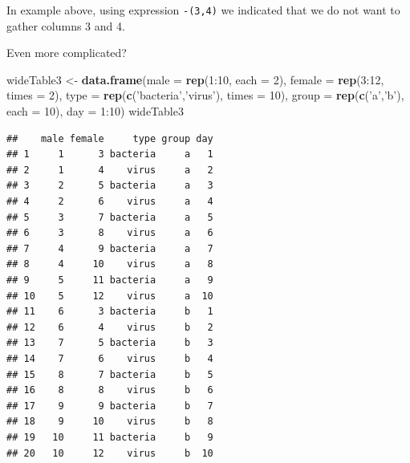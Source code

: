 \documentclass[]{book}
\newenvironment{Shaded}{\begin{snugshade}}{\end{snugshade}}
\newcommand{\KeywordTok}[1]{\textcolor[rgb]{0.12,0.11,0.11}{\textbf{#1}}}
\newcommand{\DataTypeTok}[1]{\textcolor[rgb]{0.00,0.34,0.68}{#1}}
\newcommand{\DecValTok}[1]{\textcolor[rgb]{0.69,0.50,0.00}{#1}}
\newcommand{\StringTok}[1]{\textcolor[rgb]{0.75,0.01,0.01}{#1}}
\newcommand{\OperatorTok}[1]{\textcolor[rgb]{0.12,0.11,0.11}{#1}}
\newcommand{\NormalTok}[1]{\textcolor[rgb]{0.12,0.11,0.11}{#1}}
\theoremstyle{definition}
\theoremstyle{definition}
\theoremstyle{definition}
\theoremstyle{remark}
\begin{document}
In example above, using expression \texttt{-(3,4)} we indicated that we
do not want to gather columns 3 and 4.

Even more complicated?

\begin{Shaded}
\begin{Highlighting}[]
\NormalTok{wideTable3 <-}\StringTok{ }\KeywordTok{data.frame}\NormalTok{(}\DataTypeTok{male =} \KeywordTok{rep}\NormalTok{(}\DecValTok{1}\OperatorTok{:}\DecValTok{10}\NormalTok{, }\DataTypeTok{each =} \DecValTok{2}\NormalTok{),}
                         \DataTypeTok{female =} \KeywordTok{rep}\NormalTok{(}\DecValTok{3}\OperatorTok{:}\DecValTok{12}\NormalTok{, }\DataTypeTok{times =} \DecValTok{2}\NormalTok{), }
                         \DataTypeTok{type =} \KeywordTok{rep}\NormalTok{(}\KeywordTok{c}\NormalTok{(}\StringTok{'bacteria'}\NormalTok{,}\StringTok{'virus'}\NormalTok{), }\DataTypeTok{times =} \DecValTok{10}\NormalTok{),}
                         \DataTypeTok{group =} \KeywordTok{rep}\NormalTok{(}\KeywordTok{c}\NormalTok{(}\StringTok{'a'}\NormalTok{,}\StringTok{'b'}\NormalTok{), }\DataTypeTok{each =} \DecValTok{10}\NormalTok{),}
                         \DataTypeTok{day =} \DecValTok{1}\OperatorTok{:}\DecValTok{10}\NormalTok{)}
\NormalTok{wideTable3}
\end{Highlighting}
\end{Shaded}

\begin{verbatim}
##    male female     type group day
## 1     1      3 bacteria     a   1
## 2     1      4    virus     a   2
## 3     2      5 bacteria     a   3
## 4     2      6    virus     a   4
## 5     3      7 bacteria     a   5
## 6     3      8    virus     a   6
## 7     4      9 bacteria     a   7
## 8     4     10    virus     a   8
## 9     5     11 bacteria     a   9
## 10    5     12    virus     a  10
## 11    6      3 bacteria     b   1
## 12    6      4    virus     b   2
## 13    7      5 bacteria     b   3
## 14    7      6    virus     b   4
## 15    8      7 bacteria     b   5
## 16    8      8    virus     b   6
## 17    9      9 bacteria     b   7
## 18    9     10    virus     b   8
## 19   10     11 bacteria     b   9
## 20   10     12    virus     b  10
\end{verbatim}

\begin{Shaded}
\end{Shaded}
\end{document}
